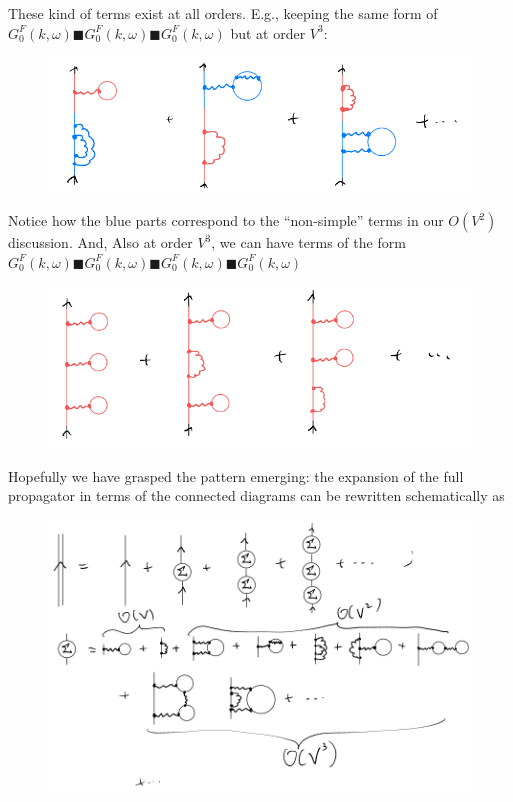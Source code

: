 These kind of terms exist at all orders. E.g., keeping the same form of $G_{0}^{F}\left( k,\omega \right) \blacksquare G_{0}^{F}\left( k,\omega \right) \blacksquare G_{0}^{F}\left( k,\omega \right)$ but at order $V^3$:
\begin{figure}[H]
    \centering
    \includegraphics[width=\textwidth]{jupyterbook/data/fig/lec18-fig08.png}
\end{figure}
Notice how the blue parts correspond to the ``non-simple'' terms in our $O(V^2)$ discussion. And, Also at order $V^3$, we can have terms of the form $G_{0}^{F}\left( k,\omega \right) \blacksquare G_{0}^{F}\left( k,\omega \right) \blacksquare G_{0}^{F}\left( k,\omega \right) \blacksquare G_{0}^{F}\left( k,\omega \right) $
\begin{figure}[H]
    \centering
    \includegraphics[width=\textwidth]{jupyterbook/data/fig/lec18-fig09.png}
\end{figure}
Hopefully we have grasped the pattern emerging: the expansion of the full propagator in terms of the connected diagrams can be rewritten schematically as
\begin{figure}[H]
    \centering
    \includegraphics[width=\textwidth]{jupyterbook/data/fig/lec18-fig10.png}
\end{figure}

